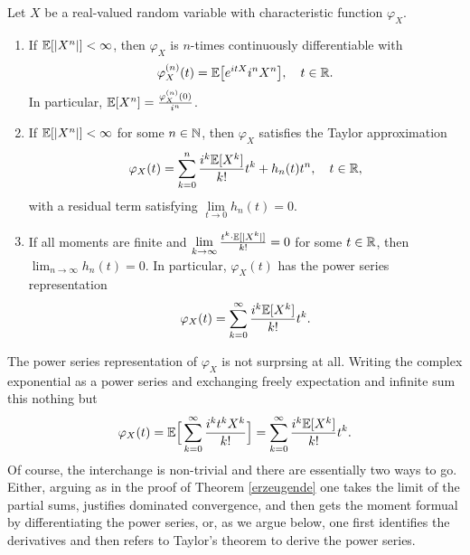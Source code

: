 \begin{laussagewerkzeug}
\begin{theorem}\label{theorem_moments}
	Let $X$ be a real-valued random variable with characteristic function $\varphi_X$.
	\begin{enumerate}[label=(\roman*)]
		\item
			If $\mathbb{E}[ \lvert X^n \rvert ] < \infty$, then $\varphi_X$ is $n$-times continuously differentiable with $$ \varphi_X^{(n)}(t) = \mathbb{E} \big[ e^{itX}i^n X^n \big], \quad t \in \mathbb{R}.$$
			In particular, $\mathbb{E}[X^n]=\frac{\varphi^{(n)}_X(0)}{i^n }$.
		\item
			If $\mathbb{E} [ \lvert X^n \rvert ] < \infty$ for some $n\in\mathbb{N}$, then $\varphi_X$ satisfies the Taylor approximation
			\begin{align}\label{Taylor}
				\varphi_X(t) = \sum_{k=0}^n \frac{i^k \mathbb{E}[X^k]}{k!} t^k + h_n(t)t^n, \quad t\in \mathbb{R},
			\end{align}
			with a residual term satisfying $\lim\limits_{t \to 0} h_n(t) =0$.
		\item
			If all moments are finite and $\lim\limits_{k \to \infty} \frac{t^k \cdot \mathbb{E} [ \lvert X^k \rvert ]}{k!} = 0$ for some $t\in\mathbb{R}$, then $\lim_{n\to\infty} h_n(t) =0$. In particular, $\varphi_X(t)$ has the power series representation
			\begin{align*}
				\varphi_X(t) = \sum_{k=0}^{\infty} \frac{i^k \mathbb{E}[X^k]}{k!}t^k.
			\end{align*}
	\end{enumerate}
\end{theorem}
\end{laussagewerkzeug}
The power series representation of $\varphi_X$ is not surprsing at all. Writing the complex exponential as a power series and exchanging freely expectation and infinite sum this nothing but
\begin{align*}
	\varphi_X(t)=\mathbb{E}\Big[\sum_{k=0}^\infty \frac{i^kt^kX^k}{k!}\Big]=\sum_{k=0}^\infty \frac{i^k\mathbb{E}[X^k]}{k!}t^k.
\end{align*}
Of course, the interchange is non-trivial and there are essentially two ways to go. Either, arguing as in the proof of Theorem \ref{erzeugende} one takes the limit of the partial sums, justifies dominated convergence, and then gets the moment formual by differentiating the power series, or, as we argue below, one first identifies the derivatives and then refers to Taylor's theorem to derive the power series.
